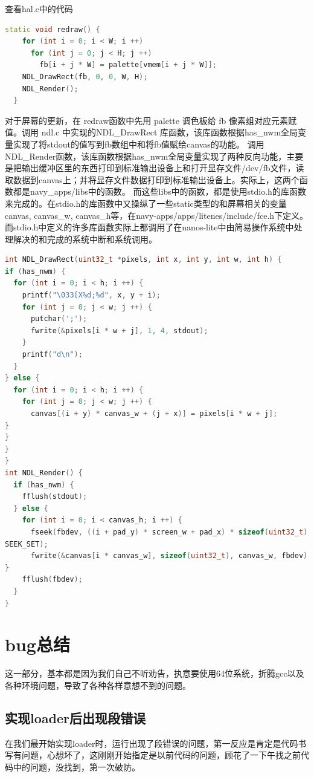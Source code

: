 \documentclass[UTF8,a4paper,10pt]{ctexart}
\begin{document}
查看hal.c中的代码
\begin{lstlisting}[language = C++]
  static void redraw() {
    for (int i = 0; i < W; i ++)
      for (int j = 0; j < H; j ++)
        fb[i + j * W] = palette[vmem[i + j * W]];
    NDL_DrawRect(fb, 0, 0, W, H);
    NDL_Render();
  }
  \end{lstlisting}

  对于屏幕的更新，在 redraw函数中先用 palette 调色板给 fb 像素组对应元素赋值。调用 ndl.c 中实现的NDL\_DrawRect 库函数，该库函数根据has\_nwm全局变量实现了将stdout的值写到fb数组中和将fb值赋给canvas的功能。 调用NDL\_Render函数，该库函数根据has\_nwm全局变量实现了两种反向功能，主要是把输出缓冲区里的东西打印到标准输出设备上和打开显存文件/dev/fb文件，读取数据到canvas上；并将显存文件数据打印到标准输出设备上。实际上，这两个函数都是navy\_apps/libs中的函数。 而这些libs中的函数，都是使用stdio.h的库函数来完成的。在stdio.h的库函数中又操纵了一些static类型的和屏幕相关的变量canvas, canvas\_w, canvas\_h等，在navy-apps/apps/litenes/include/fce.h下定义。
  而stdio.h中定义的许多库函数实际上都调用了在nanos-lite中由简易操作系统中处理解决的和完成的系统中断和系统调用。

\begin{lstlisting}[language = C++]
int NDL_DrawRect(uint32_t *pixels, int x, int y, int w, int h) {
if (has_nwm) {
  for (int i = 0; i < h; i ++) {
    printf("\033[X%d;%d", x, y + i);
    for (int j = 0; j < w; j ++) {
      putchar(';');
      fwrite(&pixels[i * w + j], 1, 4, stdout);
    }
    printf("d\n");
  }
} else {
  for (int i = 0; i < h; i ++) {
    for (int j = 0; j < w; j ++) {
      canvas[(i + y) * canvas_w + (j + x)] = pixels[i * w + j];
} 
} 
}
}
int NDL_Render() {
  if (has_nwm) {
    fflush(stdout);
  } else {
    for (int i = 0; i < canvas_h; i ++) {
      fseek(fbdev, ((i + pad_y) * screen_w + pad_x) * sizeof(uint32_t),
SEEK_SET);
      fwrite(&canvas[i * canvas_w], sizeof(uint32_t), canvas_w, fbdev);
}
    fflush(fbdev);
  }
}
\end{lstlisting}





\section{bug总结}
这一部分，基本都是因为我们自己不听劝告，执意要使用64位系统，折腾gcc以及各种环境问题，导致了各种各样意想不到的问题。
\subsection{实现loader后出现段错误}
在我们最开始实现loader时，运行出现了段错误的问题，第一反应是肯定是代码书写有问题，心想坏了，这刚刚开始指定是以前代码的问题，顾花了一下午找之前代码中的问题，没找到，第一次破防。
\end{document}

